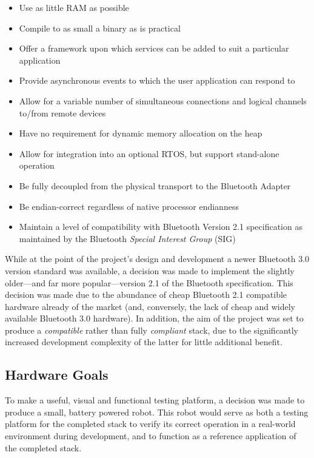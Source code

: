 \begin{itemize}
	\item Use as little RAM as possible
	\item Compile to as small a binary as is practical
	\item Offer a framework upon which services can be added to suit a particular application
	\item Provide asynchronous events to which the user application can respond to
	\item Allow for a variable number of simultaneous connections and logical channels to/from remote devices
	\item Have no requirement for dynamic memory allocation on the heap
	\item Allow for integration into an optional RTOS, but support stand-alone operation
	\item Be fully decoupled from the physical transport to the Bluetooth Adapter
	\item Be endian-correct regardless of native processor endianness
	\item Maintain a level of compatibility with Bluetooth Version 2.1 specification as maintained by the Bluetooth \textit{Special Interest Group} (SIG)
\end{itemize}

While at the point of the project's design and development a newer Bluetooth 3.0 version standard was available, a decision was made to implement the slightly older---and far more popular---version 2.1 of the Bluetooth specification. This decision was made due to the abundance of cheap Bluetooth 2.1 compatible hardware already of the market (and, conversely, the lack of cheap and widely available Bluetooth 3.0 hardware). In addition, the aim of the project was set to produce a \textit{compatible} rather than fully \textit{compliant} stack, due to the significantly increased development complexity of the latter for little additional benefit.

\subsection{Hardware Goals}

To make a useful, visual and functional testing platform, a decision was made to produce a small, battery powered robot. This robot would serve as both a testing platform for the completed stack to verify its correct operation in a real-world environment during development, and to function as a reference application of the completed stack.

